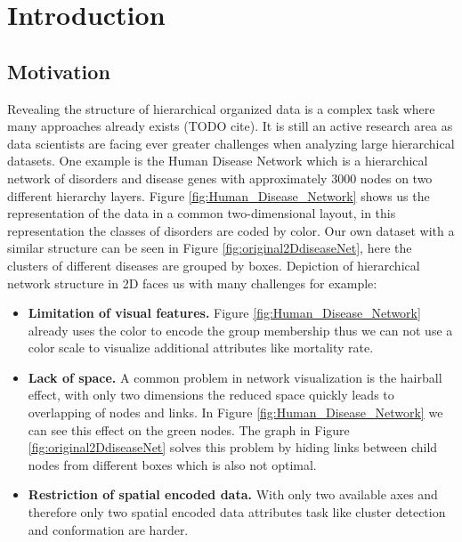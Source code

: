 \chapter{Introduction}

\section{Motivation}
Revealing the structure of hierarchical organized data is a complex task where many approaches already exists (TODO cite). It is still an active research area as data scientists are facing ever greater challenges when analyzing large hierarchical datasets. One example is the Human Disease Network \cite{zhou_human_2014} which is a hierarchical network of disorders and disease genes with approximately 3000 nodes on two different hierarchy layers. Figure \ref{fig:Human_Disease_Network} shows us the representation of the data in a common two-dimensional layout, in this representation the classes of disorders are coded by color. 
Our own dataset with a similar structure can be seen in Figure \ref{fig:original2DdiseaseNet}, here the clusters of different diseases are grouped by boxes. Depiction of hierarchical network structure in 2D faces us with many challenges for example: 
\begin{itemize}
    \item \textbf{Limitation of visual features.} Figure \ref{fig:Human_Disease_Network} already uses the color to encode the group membership thus we can not use a color scale to visualize additional attributes like mortality rate.
    \item \textbf{Lack of space.} A common problem in network visualization is the hairball effect, with only two dimensions the reduced space quickly leads to overlapping of nodes and links. In Figure \ref{fig:Human_Disease_Network} we can see this effect on the green nodes. The graph in Figure \ref{fig:original2DdiseaseNet} solves this problem by hiding links between child nodes from different boxes which is also not optimal.
    \item \textbf{Restriction of spatial encoded data.} With only two available axes and therefore only two spatial encoded data attributes task like cluster detection and conformation are harder.
\end{itemize} 

